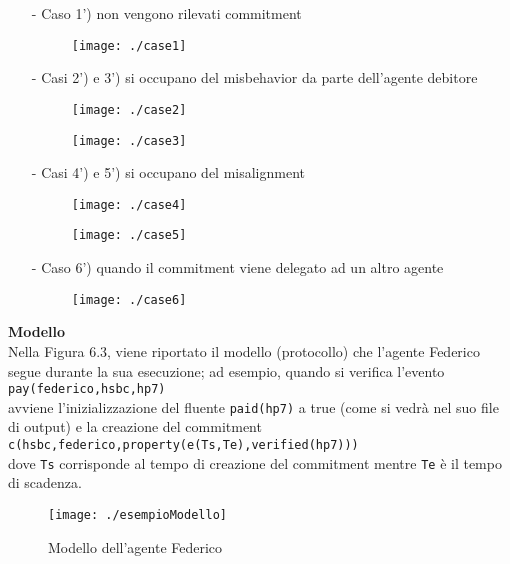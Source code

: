\documentclass[a4paper,12pt]{report}
\begin{document}
\begin{enumerate}
    \item[-] Caso 1') non vengono rilevati commitment
    \begin{figure}[h]
        \texttt{[image: ./case1]}
    \end{figure}
    \item[-] Casi 2') e 3') si occupano del misbehavior da parte dell'agente debitore
    \begin{figure}[h]
        \texttt{[image: ./case2]}
    \end{figure}
    \begin{figure}[h]
        \texttt{[image: ./case3]}
    \end{figure}
    \newpage
    \item[-] Casi 4') e 5') si occupano del misalignment
    \begin{figure}[h]
        \texttt{[image: ./case4]}
    \end{figure}
    \begin{figure}[h]             
        \texttt{[image: ./case5]}
    \end{figure}
    \item[-] Caso 6') quando il commitment viene delegato ad un altro agente
    \begin{figure}[h]
        \texttt{[image: ./case6]}
    \end{figure}
\end{enumerate}
\newpage
\textbf{Modello}\\
Nella Figura 6.3, viene riportato il modello (protocollo) che l'agente Federico segue durante la sua esecuzione; ad esempio, quando si verifica l'evento\\
\texttt{pay(federico,hsbc,hp7)}\\
avviene l'inizializzazione del fluente \texttt{paid(hp7)} a true (come si vedrà nel suo file di output) e la creazione del commitment\\ \texttt{c(hsbc,federico,property(e(Ts,Te),verified(hp7)))}\\
dove \texttt{Ts} corrisponde al tempo di creazione del commitment mentre \texttt{Te} è il tempo di scadenza.
\begin{figure}[h]
    \begin{center}
        \texttt{[image: ./esempioModello]}
        \caption{Modello dell'agente Federico}
        \label{modello}
    \end{center}
\end{figure}
\end{document}
